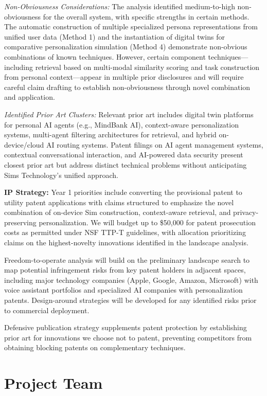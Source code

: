 \documentclass[11pt]{article}
\begin{document}
\textit{Non-Obviousness Considerations:} The analysis identified medium-to-high non-obviousness for the overall system, with specific strengths in certain methods. The automatic construction of multiple specialized persona representations from unified user data (Method 1) and the instantiation of digital twins for comparative personalization simulation (Method 4) demonstrate non-obvious combinations of known techniques. However, certain component techniques---including retrieval based on multi-modal similarity scoring and task construction from personal context---appear in multiple prior disclosures and will require careful claim drafting to establish non-obviousness through novel combination and application.

\textit{Identified Prior Art Clusters:} Relevant prior art includes digital twin platforms for personal AI agents (e.g., MindBank AI), context-aware personalization systems, multi-agent filtering architectures for retrieval, and hybrid on-device/cloud AI routing systems. Patent filings on AI agent management systems, contextual conversational interaction, and AI-powered data security present closest prior art but address distinct technical problems without anticipating Sims Technology's unified approach.

\textbf{IP Strategy:}
Year 1 priorities include converting the provisional patent to utility patent applications with claims structured to emphasize the novel combination of on-device Sim construction, context-aware retrieval, and privacy-preserving personalization. We will budget up to \$50,000 for patent prosecution costs as permitted under NSF TTP-T guidelines, with allocation prioritizing claims on the highest-novelty innovations identified in the landscape analysis.

Freedom-to-operate analysis will build on the preliminary landscape search to map potential infringement risks from key patent holders in adjacent spaces, including major technology companies (Apple, Google, Amazon, Microsoft) with voice assistant portfolios and specialized AI companies with personalization patents. Design-around strategies will be developed for any identified risks prior to commercial deployment.

Defensive publication strategy supplements patent protection by establishing prior art for innovations we choose not to patent, preventing competitors from obtaining blocking patents on complementary techniques.

\vspace*{-8pt}
\section{Project Team}
\label{sec:team}
\end{document}
